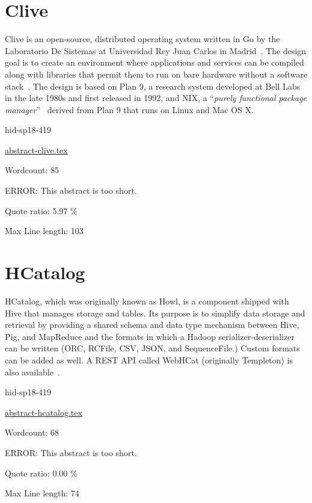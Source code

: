 \section{Clive}

Clive is an open-source, distributed operating system written in Go by
the Laboratorio De Sistemas at Universidad Rey Juan Carlos in
Madrid~\cite{hid-sp18-419-www-clive-lsub}. The design goal is to create
an environment where applications and services can be compiled along
with libraries that permit them to run on bare hardware without a
software stack~\cite{hid-sp18-419-www-clive-lsub2014}. The design is
based on Plan 9, a research system developed at Bell
Labs in the late 1980s and first released in
1992\cite{hid-sp18-419-www-about-plan9}, and NIX, a
\color{blue}``\emph{purely functional package manager}''\color{black}~\cite{hid-sp18-419-www-about-nix}
derived from Plan 9 that runs on Linux and Mac OS X.


\begin{IU}

hid-sp18-419

\href{https://github.com/cloudmesh-community/hid-sp18-419/blob/master//technology/abstract-clive.tex}{abstract-clive.tex}

 

Wordcount: 85

ERROR: This abstract is too short.


Quote ratio: 5.97 \%
 
Max Line length: 103
\end{IU}

\section{HCatalog}

HCatalog, which was originally known as Howl, is a component shipped
with Hive that manages storage and tables. Its purpose is to simplify
data storage and retrieval by providing a shared schema and data type
mechanism between Hive, Pig, and MapReduce and the formats
in which a Hadoop serializer-deserializer can be written (ORC,
RCFile, CSV, JSON, and SequenceFile.) Custom formats can be added as
well. A REST API called WebHCat (originally Templeton) is also
available~\cite{hid-sp18-419-www-hc-wiki}.


\begin{IU}

hid-sp18-419

\href{https://github.com/cloudmesh-community/hid-sp18-419/blob/master//technology/abstract-hcatalog.tex}{abstract-hcatalog.tex}

 

Wordcount: 68

ERROR: This abstract is too short.


Quote ratio: 0.00 \%
 
Max Line length: 74
\end{IU}

